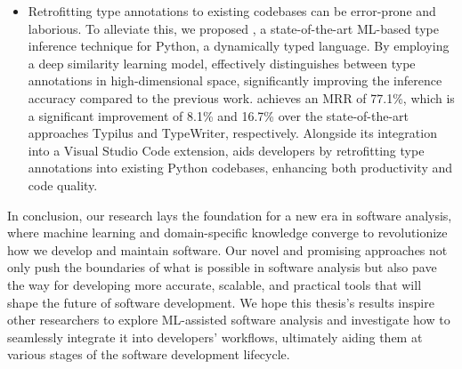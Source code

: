 \begin{itemize}
    \item Retrofitting type annotations to existing codebases can be error-prone and laborious. To alleviate this, we proposed , a state-of-the-art ML-based type inference technique for Python, a dynamically typed language. By employing a deep similarity learning model,  effectively distinguishes between type annotations in high-dimensional space, significantly improving the inference accuracy compared to the previous work.  achieves an MRR of 77.1\%, which is a significant improvement of 8.1\% and 16.7\% over the state-of-the-art approaches Typilus and TypeWriter, respectively. Alongside its integration into a Visual Studio Code extension,  aids developers by retrofitting type annotations into existing Python codebases, enhancing both productivity and code quality.
\end{itemize}

In conclusion, our research lays the foundation for a new era in software analysis, where machine learning and domain-specific knowledge converge to revolutionize how we develop and maintain software. Our novel and promising approaches not only push the boundaries of what is possible in software analysis but also pave the way for developing more accurate, scalable, and practical tools that will shape the future of software development. We hope this thesis's results inspire other researchers to explore ML-assisted software analysis and investigate how to seamlessly integrate it into developers' workflows, ultimately aiding them at various stages of the software development lifecycle.